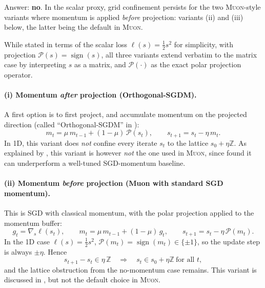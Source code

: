 \documentclass{article}
\theoremstyle{plain}
\theoremstyle{definition}
\theoremstyle{remark}
\newcommand{\Z}{\mathbb{Z}}
\newcommand{\proj}{\mathcal{P}}
\newcommand{\sign}{\operatorname{sign}}
\newcommand{\sv}{{s}} %
\newcommand{\Muon}{\textsc{Muon}}
\begin{document}
Answer: \textbf{no}. In the scalar proxy, grid confinement persists for the two
\Muon{}-style variants where momentum is applied \emph{before} projection: 
variants (ii) and (iii) below, the latter being the default in \Muon{}.

While stated in terms of the scalar loss $\ell(\sv)=\tfrac12\sv^2$ for simplicity, with projection $\proj(\sv)=\sign(\sv)$, 
all three variants extend verbatim to the matrix case by 
interpreting $\sv$ as a matrix, and $\proj(\cdot)$ as the exact polar projection operator. 

\paragraph{(i) Momentum \emph{after} projection (Orthogonal-SGDM).}
A first option is to first project, and accumulate momentum on the projected direction
(called ``Orthogonal-SGDM'' in \cite{tuddenham2022orthogonalisinggradientsspeedneural}):
\begin{equation}
  m_t = \mu\, m_{t-1} + (1-\mu)\,\proj(\sv_t),
  \qquad
  \sv_{t+1} = \sv_t - \eta\, m_t.
  \label{eq:orth-sgdm}
\end{equation}
In 1D, this variant does \emph{not} confine every iterate $s_t$ to the lattice $\sv_0+\eta\Z$.  
As explained by \citet{jordan2024muon}, this variant is however \emph{not} the one used in \Muon{}, 
since \citet{tuddenham2022orthogonalisinggradientsspeedneural} found it can underperform 
a well-tuned SGD-momentum baseline. 

\paragraph{(ii) Momentum \emph{before} projection (Muon with standard SGD momentum).}
This is SGD with classical momentum, with the polar projection applied to the momentum buffer:
\begin{equation}
  g_t = \nabla_\sv \ell(\sv_t),
  \qquad
  m_t = \mu\, m_{t-1} + (1-\mu)\,g_t,
  \qquad
  \sv_{t+1} = \sv_t - \eta\,\proj(m_t).
  \label{eq:muon-std-mom}
\end{equation}
In the 1D case $\ell(\sv)=\tfrac12\sv^2$, $\proj(m_t)=\sign(m_t)\in\{\pm 1\}$, so the update step is always $\pm\eta$.
Hence
\begin{equation}
  \sv_{t+1}-\sv_t \in \eta\,\Z
  \quad\Longrightarrow\quad
  \sv_t\in \sv_0+\eta\Z\ \text{for all }t,
  \label{eq:grid-std-mom}
\end{equation}
and the lattice obstruction from the no-momentum case remains. 
This variant is discussed in \cite{jordan2024muon}, but not the default choice in \Muon{}. 
\end{document}

